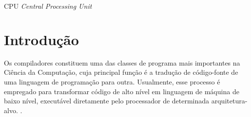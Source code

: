 \documentclass[
	12pt,				%
	openright,			%
	oneside,			%
	a4paper,			%
	tccpreliminar,			%
	]{ABNT-DC-UEL}
\begin{document}
\listoftables*
\cleardoublepage

\begin{siglas}
  \item[CPU] \textit{Central Processing Unit}
\end{siglas}


\tableofcontents*
\cleardoublepage



\textual
\pagestyle{dc-uel-header} %


\chapter{Introdução}
Os compiladores constituem uma das classes de programa mais importantes na Ciência da Computação, cuja principal função é a tradução de código-fonte de uma linguagem de programação para outra. Usualmente, esse processo é empregado para transformar código de alto nível em linguagem de máquina de baixo nível, executável diretamente pelo processador de determinada arquitetura-alvo. \cite{aho:07}.
\end{document}
